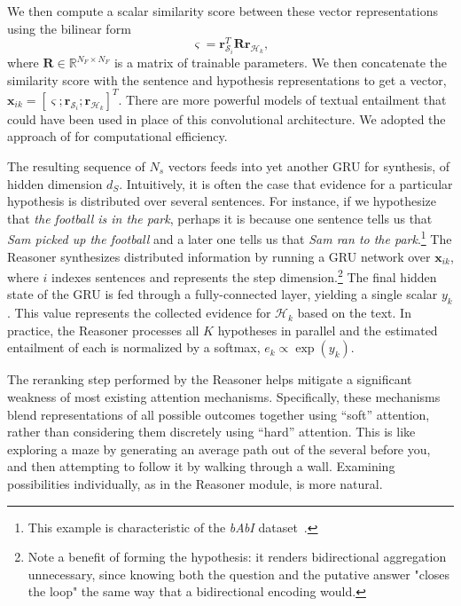 \documentclass[11pt,letterpaper]{article}
\def\x{\times}
\begin{document}
We then compute a scalar similarity score between these vector representations using the bilinear form
\begin{equation}
	\varsigma = \mathbf{r}^T_{\mathcal{S}_i} \mathbf{R}  \mathbf{r}_{\mathcal{H}_k},
	\label{eq:simscore}
\end{equation}
where $\mathbf{R} \in \mathbb{R}^{N_F \x N_F}$ is a matrix of trainable parameters. We then concatenate the similarity score with the sentence and hypothesis representations to get a vector, $\mathbf{x}_{ik} = [\varsigma; \mathbf{r}_{\mathcal{S}_i}; \mathbf{r}_{\mathcal{H}_k}]^T$. There are more powerful models of textual entailment that could have been used in place of this convolutional architecture. We adopted the approach of  for computational efficiency.

The resulting sequence of $N_s$ vectors feeds into yet another GRU for synthesis, of hidden dimension $d_S$. Intuitively, it is often the case that evidence for a particular hypothesis is distributed over several sentences. For instance, if we hypothesize that \textsl{the football is in the park}, perhaps it is because one sentence tells us that \textsl{Sam picked up the football} and a later one tells us that \textsl{Sam ran to the park}.\footnote{This example is characteristic of the {\it bAbI} dataset~\cite{weston2015}.} The Reasoner synthesizes distributed information by running a GRU network over $\mathbf{x}_{ik}$, where $i$ indexes sentences and represents the step dimension.\footnote{Note a benefit of forming the hypothesis: it renders bidirectional aggregation unnecessary, since knowing both the question and the putative answer "closes the loop" the same way that a bidirectional encoding would.} The final hidden state of the GRU is fed through a fully-connected layer, yielding a single scalar $y_k$. This value represents the collected evidence for $\mathcal{H}_k$ based on the text. In practice, the Reasoner processes all $K$ hypotheses in parallel and the estimated entailment of each is normalized by a softmax, $e_k \propto \exp(y_k)$.

The reranking step performed by the Reasoner helps mitigate a significant weakness of most existing attention mechanisms. Specifically, these mechanisms blend representations of all possible outcomes together using ``soft'' attention, rather than considering them discretely using ``hard'' attention. This is like exploring a maze by generating an average path out of the several before you, and then attempting to follow it by walking through a wall. Examining possibilities individually, as in the Reasoner module, is more natural.
\end{document}

